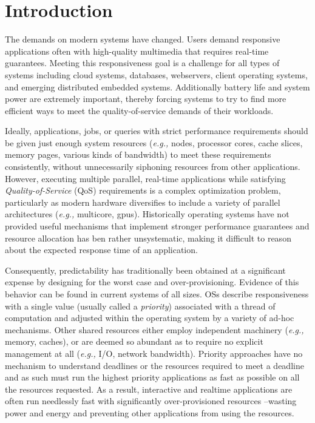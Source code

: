 \section{Introduction}


The demands on modern systems have changed.  Users demand responsive applications often with high-quality multimedia that requires real-time guarantees.  Meeting this responsiveness goal is a challenge for all types of systems including cloud systems, databases, webservers, client operating systems, and emerging distributed embedded systems. Additionally battery life and system power are extremely important, thereby forcing systems to try to find more efficient ways to meet the quality-of-service demands of their workloads.

Ideally, applications, jobs, or queries with strict performance requirements should be given just enough system resources (\emph{e.g.,} nodes, processor cores, cache slices, memory pages, various kinds of bandwidth) to meet these requirements consistently, without unnecessarily siphoning resources from other applications. However, executing multiple parallel, real-time applications while satisfying  \emph{Quality-of-Service} (QoS) requirements is a complex optimization problem, particularly as modern hardware diversifies to include a variety of parallel architectures (\emph{e.g.,} multicore, gpus).  Historically operating systems have not provided useful mechanisms that implement stronger performance guarantees and resource allocation has ben rather unsystematic, making it difficult to reason about the expected response time of an application. 

Consequently, predictability has traditionally been obtained at a significant expense by designing for the worst case and over-provisioning.  Evidence of this behavior can be found in current systems of all sizes.  OSs describe responsiveness with a single value (usually called a \emph{priority}) associated with a thread of computation and adjusted within the operating system by a variety of ad-hoc mechanisms. Other shared resources either employ independent machinery (\emph{e.g.,} memory, caches), or are deemed so abundant as to require no explicit management at all (\emph{e.g.,} I/O, network bandwidth).
 Priority approaches have no mechanism to understand deadlines or the resources required to meet a deadline and as such must run the highest priority applications as fast as possible on all the resources requested.   As a result, interactive and realtime applications are often run needlessly fast with significantly over-provisioned resources --wasting power and energy and preventing other applications from using the resources.  

